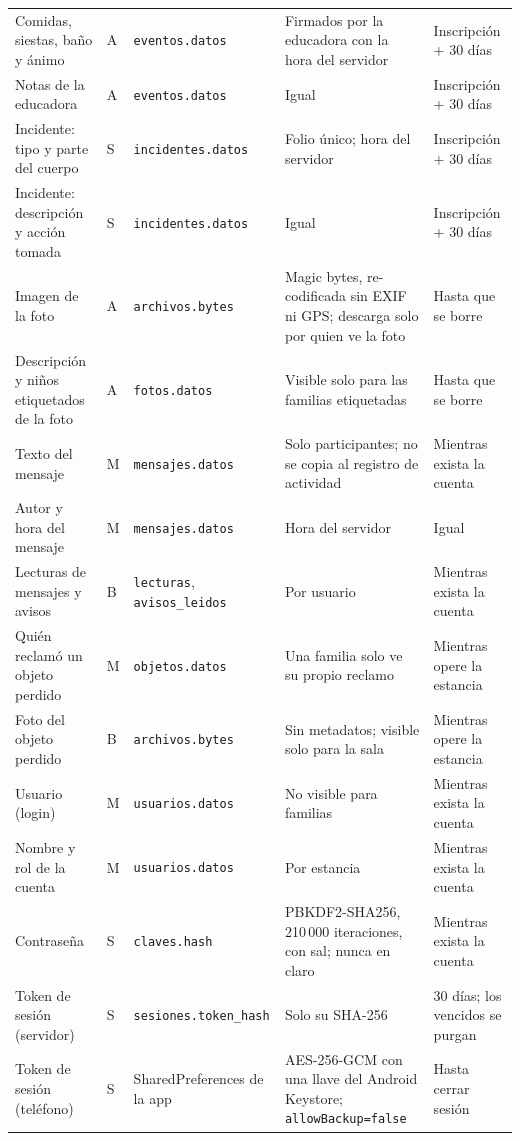 {\begin{longtable}{p{3.6cm}p{1.3cm}p{3.2cm}p{3.6cm}p{3.0cm}}
Comidas, siestas, baño y ánimo & A & \texttt{eventos.\allowbreak{}datos} & Firmados por la educadora con la hora del servidor & Inscripción + 30 días\\
Notas de la educadora & A & \texttt{eventos.\allowbreak{}datos} & Igual & Inscripción + 30 días\\
Incidente: tipo y parte del cuerpo & S & \texttt{incidentes.\allowbreak{}datos} & Folio único; hora del servidor & Inscripción + 30 días\\
Incidente: descripción y acción tomada & S & \texttt{incidentes.\allowbreak{}datos} & Igual & Inscripción + 30 días\\
Imagen de la foto & A & \texttt{archivos.\allowbreak{}bytes} & Magic bytes, re-codificada sin EXIF ni GPS; descarga solo por quien ve la foto & Hasta que se borre\\
Descripción y niños etiquetados de la foto & A & \texttt{fotos.\allowbreak{}datos} & Visible solo para las familias etiquetadas & Hasta que se borre\\
Texto del mensaje & M & \texttt{mensajes.\allowbreak{}datos} & Solo participantes; no se copia al registro de actividad & Mientras exista la cuenta\\
Autor y hora del mensaje & M & \texttt{mensajes.\allowbreak{}datos} & Hora del servidor & Igual\\
Lecturas de mensajes y avisos & B & \texttt{lecturas}, \texttt{avisos\_leidos} & Por usuario & Mientras exista la cuenta\\
Quién reclamó un objeto perdido & M & \texttt{objetos.\allowbreak{}datos} & Una familia solo ve su propio reclamo & Mientras opere la estancia\\
Foto del objeto perdido & B & \texttt{archivos.\allowbreak{}bytes} & Sin metadatos; visible solo para la sala & Mientras opere la estancia\\
Usuario (login) & M & \texttt{usuarios.\allowbreak{}datos} & No visible para familias & Mientras exista la cuenta\\
Nombre y rol de la cuenta & M & \texttt{usuarios.\allowbreak{}datos} & Por estancia & Mientras exista la cuenta\\
Contraseña & S & \texttt{claves.\allowbreak{}hash} & PBKDF2-SHA256, 210\,000 iteraciones, con sal; nunca en claro & Mientras exista la cuenta\\
Token de sesión (servidor) & S & \texttt{sesiones.\allowbreak{}token\_hash} & Solo su SHA-256 & 30 días; los vencidos se purgan\\
Token de sesión (teléfono) & S & SharedPreferences de la app & AES-256-GCM con una llave del Android Keystore; \texttt{allow\allowbreak{}Backup=false} & Hasta cerrar sesión\\

\end{longtable}}
